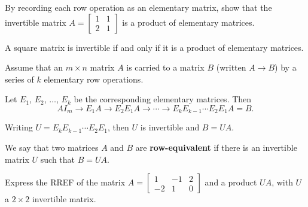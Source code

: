 \documentclass[20pt,a4paper]{extarticle}
\newcommand{\ra}{\rightarrow}
\newcounter{example}
\newcounter{theorem}
\newcounter{definition}
\begin{document}
\begin{example}
By recording each row operation as an elementary matrix, show that the invertible matrix $A = \begin{bmatrix} 1 & 1 \\ 2 & 1 \end{bmatrix}$ is a product of elementary matrices.
\end{example}

\begin{solution}

\end{solution}

\vfill 

\begin{theorem}
A square matrix is invertible if and only if it is a product of elementary matrices.
\end{theorem}

\newpage 

Assume that an $m \times n$ matrix $A$ is carried to a matrix $B$ (written $A \ra B$) by a series of $k$ elementary row operations.

Let $E_1$, $E_2$, $\ldots$, $E_k$ be the corresponding elementary matrices. Then
	\[
		A I_m \ra E_1 A \ra E_2 E_1 A \ra \cdots \ra E_k E_{k-1} \cdots E_2 E_1 A = B .
	\]

Writing $U = E_k E_{k-1} \cdots E_2 E_1$, then $U$ is invertible and $B = UA$.

\begin{definition}
We say that two matrices $A$ and $B$ are \textbf{row-equivalent} if there is an invertible matrix $U$ such that $B = UA$.
\end{definition}

\begin{example}
Express the RREF of the matrix $A = \begin{bmatrix} 1 & -1 & 2 \\ -2 & 1 & 0\end{bmatrix}$ and a product $UA$, with $U$ a $2 \times 2$ invertible matrix.
\end{example}

\begin{solution}

\end{solution}
\end{document}

